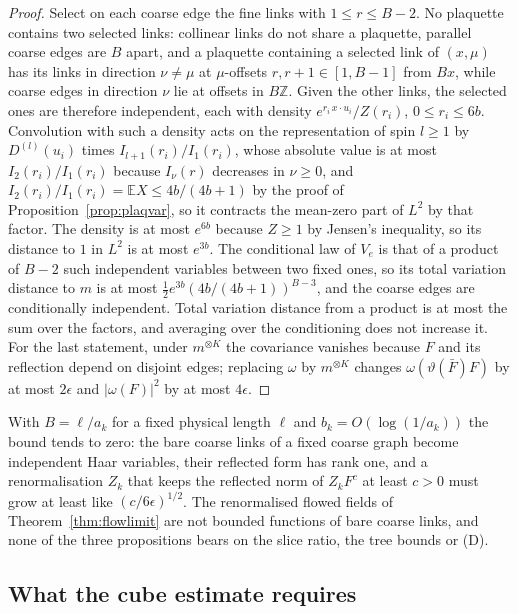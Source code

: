 \documentclass[11pt]{amsart}
\theoremstyle{definition}
\theoremstyle{remark}
\numberwithin{equation}{section}
\newcommand{\Z}{\mathbb{Z}}
\newcommand{\E}{\mathbb{E}}
\begin{document}
\begin{proof}
Select on each coarse edge the fine links with $1\le r\le B-2$. No plaquette
contains two selected links: collinear links do not share a plaquette,
parallel coarse edges are $B$ apart, and a plaquette containing a selected link
of $(x,\mu)$ has its links in direction $\nu\ne\mu$ at $\mu$-offsets $r,r+1\in
[1,B-1]$ from $Bx$, while coarse edges in direction $\nu$ lie at offsets in
$B\Z$. Given the other links, the selected ones are therefore independent, each
with density $e^{r_i\,x\cdot u_i}/Z(r_i)$, $0\le r_i\le6b$. Convolution with
such a density acts on the representation of spin $l\ge1$ by $D^{(l)}(u_i)$
times $I_{l+1}(r_i)/I_1(r_i)$, whose absolute value is at most
$I_2(r_i)/I_1(r_i)$ because $I_\nu(r)$ decreases in $\nu\ge0$, and
$I_2(r_i)/I_1(r_i)=\E X\le4b/(4b+1)$ by the proof of
Proposition~\ref{prop:plaqvar}, so it contracts the mean-zero part of $L^2$ by
that factor. The density is at most $e^{6b}$ because $Z\ge1$ by Jensen's
inequality, so its distance to $1$ in $L^2$ is at most $e^{3b}$. The
conditional law of $V_e$ is that of a product of $B-2$ such independent
variables between two fixed ones, so its total variation distance to $m$ is at
most $\frac12e^{3b}(4b/(4b+1))^{B-3}$, and the coarse edges are conditionally
independent. Total variation distance from a product is at most the sum over
the factors, and averaging over the conditioning does not increase it.
For the last statement, under $m^{\otimes K}$ the covariance vanishes because
$F$ and its reflection depend on disjoint edges; replacing $\omega$ by
$m^{\otimes K}$ changes $\omega(\vartheta(\bar F)F)$ by at most $2\epsilon$ and
$|\omega(F)|^2$ by at most $4\epsilon$.
\end{proof}

With $B=\ell/a_k$ for a fixed physical length $\ell$ and $b_k=O(\log(1/a_k))$
the bound tends to zero: the bare coarse links of a fixed coarse graph become
independent Haar variables, their reflected form has rank one, and a
renormalisation $Z_k$ that keeps the reflected norm of $Z_kF^c$ at least $c>0$
must grow at least like $(c/6\epsilon)^{1/2}$. The renormalised flowed fields
of Theorem~\ref{thm:flowlimit} are not bounded functions of bare coarse links,
and none of the three propositions bears on the slice ratio, the tree bounds or
(D).

\subsection{What the cube estimate requires}\label{ssec:cubeneeds}
\end{document}
